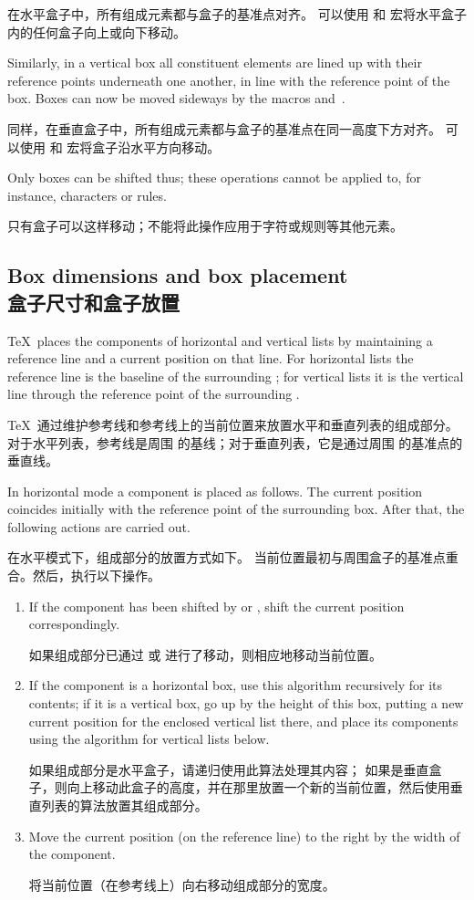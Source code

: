 在水平盒子中，所有组成元素都与盒子的基准点对齐。
可以使用  和  宏将水平盒子内的任何盒子向上或向下移动。

Similarly, in a vertical box all constituent elements
are lined up with their reference points underneath one another,
in line with the reference point of the box.
Boxes can now be moved sideways by the macros 
 and~.

同样，在垂直盒子中，所有组成元素都与盒子的基准点在同一高度下方对齐。
可以使用  和  宏将盒子沿水平方向移动。

Only boxes can be shifted thus; these operations cannot 
be applied to, for instance, characters or rules.

只有盒子可以这样移动；不能将此操作应用于字符或规则等其他元素。


\subsection{Box dimensions and box placement\\盒子尺寸和盒子放置}

\TeX\ places the components of horizontal and
vertical lists by maintaining a reference line and a
current position on that line. For horizontal lists
the reference line is the baseline of the surrounding
; for vertical lists it is the vertical line
through the reference point of the surrounding .

\TeX\ 通过维护参考线和参考线上的当前位置来放置水平和垂直列表的组成部分。
对于水平列表，参考线是周围  的基线；对于垂直列表，它是通过周围  的基准点的垂直线。

In horizontal mode a component is placed as follows.
The current position coincides initially
with the reference point of the surrounding box. After that,
the following actions are carried out.

在水平模式下，组成部分的放置方式如下。
当前位置最初与周围盒子的基准点重合。然后，执行以下操作。
\begin{enumerate} \item If the component has been shifted by
 or , shift the current
position correspondingly.

如果组成部分已通过  或  进行了移动，则相应地移动当前位置。
\item If the component is a horizontal box, use
this algorithm recursively for its contents; 
if it is a vertical box, go up  by the height of this box,
putting  a new current position for the enclosed vertical list there,
and place its components using the algorithm for vertical
lists below.

如果组成部分是水平盒子，请递归使用此算法处理其内容；
如果是垂直盒子，则向上移动此盒子的高度，并在那里放置一个新的当前位置，然后使用垂直列表的算法放置其组成部分。
\item Move the current position (on the reference line)
to the right by the width of the component.

将当前位置（在参考线上）向右移动组成部分的宽度。
\end{enumerate}

